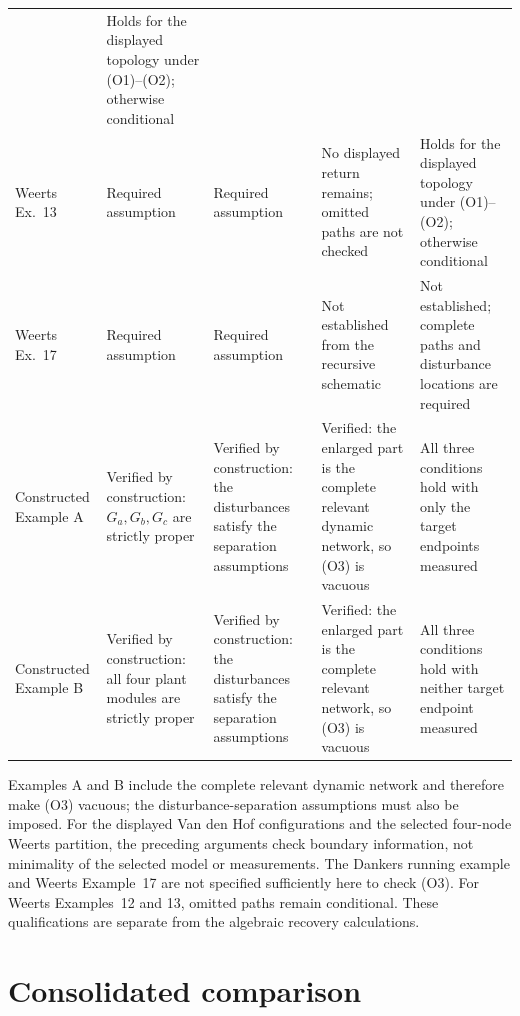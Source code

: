 \documentclass[11pt,a4paper]{article}
\begin{document}
\begin{longtable}{@{}p{}p{}p{}p{}p{}@{}}
& Holds for the displayed topology under (O1)--(O2); otherwise conditional \\
\addlinespace
Weerts Ex.~13
& Required assumption
& Required assumption
& No displayed return remains; omitted paths are not checked
& Holds for the displayed topology under (O1)--(O2); otherwise conditional \\
\addlinespace
Weerts Ex.~17
& Required assumption
& Required assumption
& Not established from the recursive schematic
& Not established; complete paths and disturbance locations are required \\
\addlinespace
Constructed Example A
& Verified by construction: $G_a,G_b,G_c$ are strictly proper
& Verified by construction: the disturbances satisfy the separation assumptions
& Verified: the enlarged part is the complete relevant dynamic network, so (O3) is vacuous
& All three conditions hold with only the target endpoints measured \\
\addlinespace
Constructed Example B
& Verified by construction: all four plant modules are strictly proper
& Verified by construction: the disturbances satisfy the separation assumptions
& Verified: the enlarged part is the complete relevant network, so (O3) is vacuous
& All three conditions hold with neither target endpoint measured \\
\end{longtable}
\normalsize

Examples A and B include the complete relevant dynamic network and therefore make (O3) vacuous; the disturbance-separation assumptions must also be imposed.  For the displayed Van den Hof configurations and the selected four-node Weerts partition, the preceding arguments check boundary information, not minimality of the selected model or measurements.  The Dankers running example and Weerts Example~17 are not specified sufficiently here to check (O3).  For Weerts Examples~12 and 13, omitted paths remain conditional.  These qualifications are separate from the algebraic recovery calculations.

\section{Consolidated comparison}
\end{document}
